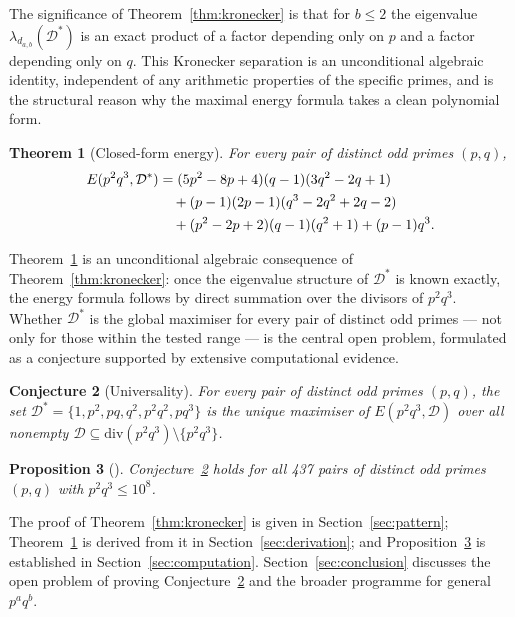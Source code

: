 \documentclass[12pt,a4paper]{article}
\theoremstyle{plain}
\newtheorem{theorem}{Theorem}[section]
\newtheorem{proposition}[theorem]{Proposition}
\newtheorem{conjecture}[theorem]{Conjecture}
\theoremstyle{definition}
\newcommand{\Dstar}{\mathcal{D}^*}
\begin{document}
The significance of Theorem~\ref{thm:kronecker} is that for $b\le2$ the
eigenvalue $\lambda_{d_{a,b}}(\Dstar)$ is an exact product of a factor
depending only on $p$ and a factor depending only on $q$.  This Kronecker
separation is an unconditional algebraic identity, independent of any
arithmetic properties of the specific primes, and is the structural reason
why the maximal energy formula takes a clean polynomial form.

\begin{theorem}[Closed-form energy]\label{thm:formula}
For every pair of distinct odd primes $(p,q)$,
\begin{align}
  E(p^2q^3,\Dstar)
  &= (5p^2-8p+4)(q-1)(3q^2-2q+1) \notag\\
  &\quad + (p-1)(2p-1)(q^3-2q^2+2q-2) \label{eq:Emax}\\
  &\quad + (p^2-2p+2)(q-1)(q^2+1)+(p-1)q^3. \notag
\end{align}
\end{theorem}

Theorem~\ref{thm:formula} is an unconditional algebraic consequence of
Theorem~\ref{thm:kronecker}: once the eigenvalue structure of $\Dstar$ is
known exactly, the energy formula follows by direct summation over the
divisors of $p^2q^3$.  Whether $\Dstar$ is the global maximiser for every
pair of distinct odd primes — not only for those within the tested range —
is the central open problem, formulated as a conjecture supported by
extensive computational evidence.

\begin{conjecture}[Universality]\label{conj:universal}
For every pair of distinct odd primes $(p,q)$, the set
$\Dstar=\{1,p^2,pq,q^2,p^2q^2,pq^3\}$ is the unique maximiser of
$E(p^2q^3,\mathcal{D})$ over all nonempty $\mathcal{D}\subseteq
\mathrm{div}(p^2q^3)\setminus\{p^2q^3\}$.
\end{conjecture}

\begin{proposition}[]\label{prop:computation}
Conjecture~\ref{conj:universal} holds for all 437 pairs of distinct odd primes $(p,q)$ with $p^2q^3\le10^8$.
\end{proposition}

The proof of Theorem~\ref{thm:kronecker} is given in
Section~\ref{sec:pattern}; Theorem~\ref{thm:formula} is derived from it
in Section~\ref{sec:derivation}; and Proposition~\ref{prop:computation}
is established in Section~\ref{sec:computation}.
Section~\ref{sec:conclusion} discusses the open problem of proving
Conjecture~\ref{conj:universal} and the broader programme for
general $p^aq^b$.
\end{document}
